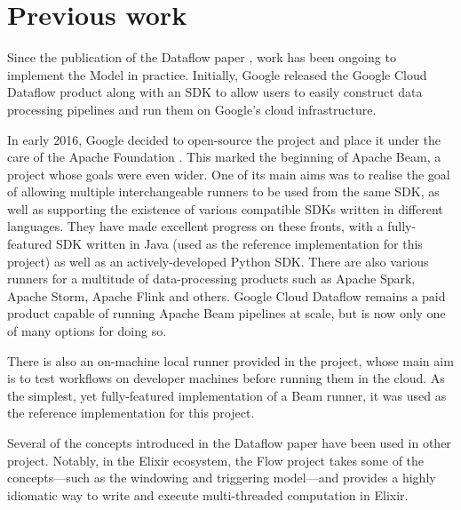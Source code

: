 
\section{Previous work}\label{sec:intro:previous}
Since the publication of the Dataflow paper \cite{Akidau:2015}, work has been ongoing to implement the Model in practice.
Initially, Google released the Google Cloud Dataflow product \cite{CloudDataflow} along with an SDK to allow users to easily construct data processing pipelines and run them on Google's cloud infrastructure.

In early 2016, Google decided to open-source the project and place it under the care of the Apache Foundation \cite{ApacheDataflowPost}.
This marked the beginning of Apache Beam, a project whose goals were even wider.
One of its main aims was to realise the goal of allowing multiple interchangeable runners to be used from the same SDK, as well as supporting the existence of various compatible SDKs written in different languages.
They have made excellent progress on these fronts, with a fully-featured SDK written in Java (used as the reference implementation for this project) as well as an actively-developed Python SDK.
There are also various runners for a multitude of data-processing products such as Apache Spark, Apache Storm, Apache Flink and others.
Google Cloud Dataflow remains a paid product capable of running Apache Beam pipelines at scale, but is now only one of many options for doing so.

There is also an on-machine local runner provided in the project, whose main aim is to test workflows on developer machines before running them in the cloud.
As the simplest, yet fully-featured implementation of a Beam runner, it was used as the reference implementation for this project.

Several of the concepts introduced in the Dataflow paper have been used in other project.
Notably, in the Elixir ecosystem, the Flow project \cite{ElixirFlow} takes some of the concepts---such as the windowing and triggering model---and provides a highly idiomatic way to write and execute multi-threaded computation in Elixir.

